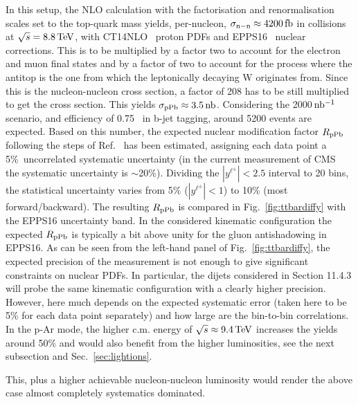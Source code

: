 \documentclass[../report.tex]{subfiles}
\begin{document}
In this setup, the NLO calculation with the factorisation and renormalisation scales set to the top-quark mass yields, per-nucleon, $\sigma_{\rm n-n} \approx 4200 \, {\rm fb}$ in \pPb collisions at $\sqrt{s} = 8.8 \, {\rm TeV}$, with CT14NLO~\cite{Dulat:2015mca} proton PDFs and EPPS16~\cite{Eskola:2016oht} nuclear corrections. This is to be multiplied by a factor two to account for the electron and muon final states and by a factor of two to account for the process where the antitop is the one from which the leptonically decaying W originates from. Since this is the nucleon-nucleon cross section, a factor of 208 has to be still multiplied to get the \pPb cross section. This yields $\sigma_{\rm pPb} \approx 3.5 \, {\rm nb}$. Considering the 2000$\, \rm nb^{-1}$ scenario, and efficiency of 0.75~\cite{dEnterria:2015mgr} in b-jet tagging, around 5200 events are expected. Based on this number,  the expected nuclear modification factor $R_{\rm pPb}$ following the steps of Ref.~\cite{dEnterria:2015mgr} has been estimated, assigning each data point a 5\%~uncorrelated systematic uncertainty (in the current \pPb measurement of CMS~\cite{Sirunyan:2017xku} the systematic uncertainty is $\sim$20\%). Dividing the $|y^{\ell^\pm}| < 2.5$ interval to 20 bins, the statistical uncertainty varies from 5\% ($|y^{\ell^\pm}| < 1$) to 10\% (most forward/backward). The resulting $R_{\rm pPb}$ is compared in Fig.~\ref{fig:ttbardiffy} with the EPPS16 uncertainty band. In the considered kinematic configuration the expected $R_{\rm pPb}$ is typically a bit above unity for the gluon antishadowing in EPPS16. As can be seen from the left-hand panel of Fig.~\ref{fig:ttbardiffy}, the expected precision of the measurement is not enough to give significant constraints on nuclear PDFs. In particular, the dijets considered in Section 11.4.3 will probe the same kinematic configuration with a clearly higher precision. However, here much depends on the expected systematic error (taken here to be 5\% for each data point separately) and how large are the bin-to-bin correlations. In the p-Ar mode, the higher c.m. energy of $\sqrt{s} \approx 9.4 \, {\rm TeV}$ increases the yields around 50\% and would also benefit from the higher luminosities, see the next subsection and Sec.~\ref{sec:lightions}.

This, plus a higher achievable nucleon-nucleon luminosity %
would render the above case almost completely systematics dominated. %
\end{document}
